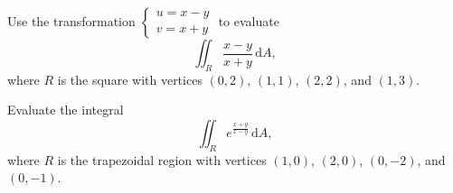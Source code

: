 \documentclass[11pt]{article}
\theoremstyle{break}
\theoremstyle{no_label}
\newcommand{\ddi}{\text{$\,$d}}
\numberwithin{equation}{theorem}
\begin{document}
\begin{example}
    Use the transformation $\left\{\begin{array}{l}
        u=x-y\\
        v=x+y
    \end{array}\right.$ to evaluate $$\iint_R\dfrac{x-y}{x+y}\ddi A,$$ where $R$ is the square with vertices $(0, 2)$, $(1, 1)$, $(2, 2)$, and $(1, 3)$.
\end{example}
\newpage

\begin{example}
    Evaluate the integral $$\iint_R e^{\frac{x+y}{x-y}}\ddi A,$$ where $R$ is the trapezoidal region with vertices $(1, 0)$, $(2, 0)$, $(0, -2)$, and $(0, -1)$.
\end{example}
\end{document}
